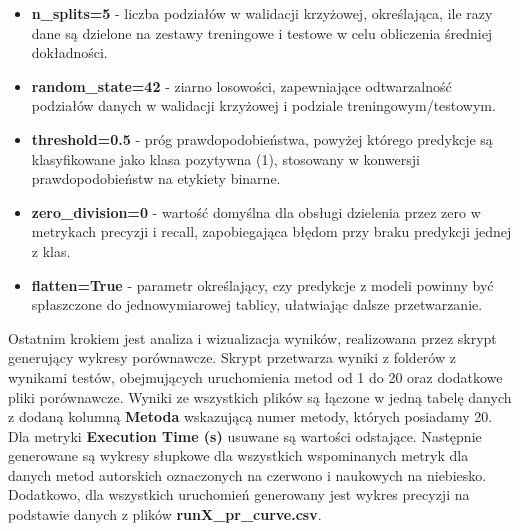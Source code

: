 \begin{itemize}
	\item \textbf{n\_splits=5} - liczba podziałów w walidacji krzyżowej, określająca, ile razy dane są dzielone na zestawy treningowe i testowe w celu obliczenia średniej dokładności.
	\item \textbf{random\_state=42} - ziarno losowości, zapewniające odtwarzalność podziałów danych w walidacji krzyżowej i podziale treningowym/testowym.
	\item \textbf{threshold=0.5} - próg prawdopodobieństwa, powyżej którego predykcje są klasyfikowane jako klasa pozytywna (1), stosowany w konwersji prawdopodobieństw na etykiety binarne.
	\item \textbf{zero\_division=0} - wartość domyślna dla obsługi dzielenia przez zero w metrykach precyzji i recall, zapobiegająca błędom przy braku predykcji jednej z klas.
	\item \textbf{flatten=True} - parametr określający, czy predykcje z modeli powinny być spłaszczone do jednowymiarowej tablicy, ułatwiając dalsze przetwarzanie.
\end{itemize}

Ostatnim krokiem jest analiza i wizualizacja wyników, realizowana przez skrypt generujący wykresy porównawcze. Skrypt przetwarza wyniki z folderów z wynikami testów, obejmujących uruchomienia metod od 1 do 20 oraz dodatkowe pliki porównawcze. Wyniki ze wszystkich plików są łączone w jedną tabelę danych z dodaną kolumną \textbf{Metoda} wskazującą numer metody, których posiadamy 20. Dla metryki \textbf{Execution Time (s)} usuwane są wartości odstające. Następnie generowane są wykresy słupkowe dla wszystkich wspominanych metryk dla danych metod autorskich oznaczonych na czerwono i naukowych na niebiesko. Dodatkowo, dla wszystkich uruchomień generowany jest wykres precyzji na podstawie danych z plików \textbf{runX\_pr\_curve.csv}.